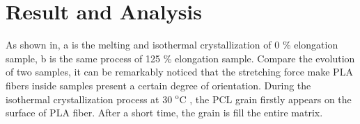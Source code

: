 \documentclass{Head}
\begin{document}


\label{sec:experiment}
\section{Result and Analysis} %
As shown in, a is the melting and isothermal crystallization of 0 \% elongation sample, b is the same process of 125 \% elongation sample. Compare the evolution of two samples, it can be remarkably noticed that the stretching force make PLA fibers inside samples  present a certain degree of orientation. During the isothermal crystallization process at 30 $\mathrm{^o C}$ , the PCL grain firstly appears on the surface of PLA fiber. After a short time, the grain is fill the entire matrix.
\end{document}
